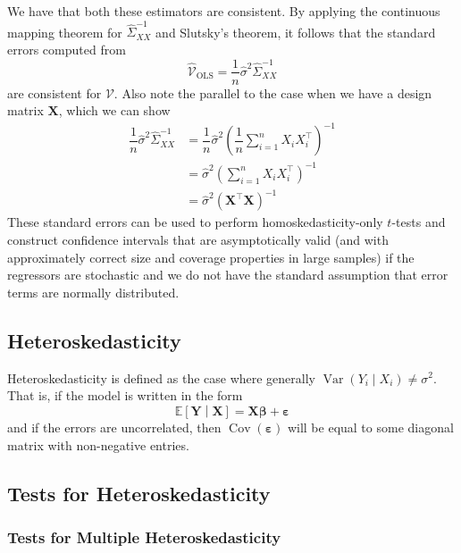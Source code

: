 \documentclass[11pt]{report} %
\begin{document}
We have that both these estimators are consistent. By applying the continuous mapping theorem for $\widehat{\Sigma}_{XX}^{-1}$ and Slutsky's theorem, it follows that the standard errors computed from
\begin{equation}
\widehat{\mathcal{V}}_{\mathrm{OLS}} = \dfrac{1}{n}\widehat{\sigma}^{2}\widehat{\Sigma}_{XX}^{-1}
\end{equation}
are consistent for $\mathcal{V}$. Also note the parallel to the case when we have a design matrix $\mathbf{X}$, which we can show
\begin{align}
\dfrac{1}{n}\widehat{\sigma}^{2}\widehat{\Sigma}_{XX}^{-1} &= \dfrac{1}{n}\widehat{\sigma}^{2}\left(\dfrac{1}{n}\sum_{i = 1}^{n}X_{i}X_{i}^{\top}\right)^{-1} \\
&= \widehat{\sigma}^{2}\left(\sum_{i = 1}^{n}X_{i}X_{i}^{\top}\right)^{-1} \\
&= \widehat{\sigma}^{2}\left(\mathbf{X}^{\top}\mathbf{X}\right)^{-1}
\end{align}
These standard errors can be used to perform homoskedasticity-only $t$-tests and construct confidence intervals that are asymptotically valid (and with approximately correct size and coverage properties in large samples) if the regressors are stochastic and we do not have the standard assumption that error terms are normally distributed.

\subsection{Heteroskedasticity}

Heteroskedasticity is defined as the case where generally $\operatorname{Var}\left(Y_{i}\middle| X_{i}\right) \neq \sigma^{2}$. That is, if the model is written in the form
\begin{equation}
\mathbb{E}\left[\mathbf{Y}\middle| \mathbf{X}\right] = \mathbf{X}\boldsymbol{\beta} + \boldsymbol{\varepsilon} 
\end{equation}
and if the errors are uncorrelated, then $\operatorname{Cov}\left(\boldsymbol{\varepsilon}\right)$ will be equal to some diagonal matrix with non-negative entries.

\subsection{Tests for Heteroskedasticity}

\subsubsection{Tests for Multiple Heteroskedasticity}
\end{document}
